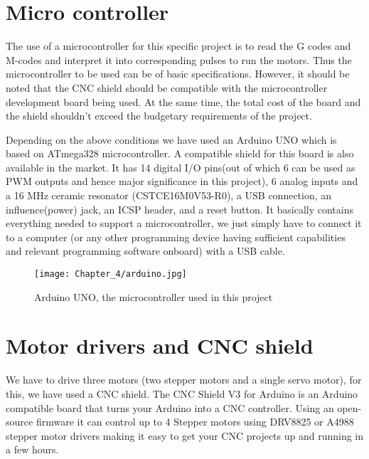 \section{Micro controller}

The use of a microcontroller for this specific project is to read the G codes and M-codes and interpret it into corresponding pulses to run the motors. Thus the microcontroller to be used can be of basic specifications. However, it should be noted that the CNC shield should be compatible with the microcontroller development board being used. At the same time, the total cost of the board and the shield shouldn’t exceed the budgetary requirements of the project. \par

Depending on the above conditions we have used an Arduino UNO which is based on ATmega328 microcontroller. A compatible shield for this board is also available in the market. It has 14 digital I/O pins(out of which 6 can be used as PWM outputs and hence major significance in this project), 6 analog inputs and a 16 MHz ceramic resonator (CSTCE16M0V53-R0), a USB connection, an influence(power) jack, an ICSP header, and a reset button. It basically contains everything needed to support a microcontroller, we just simply have to connect it to a computer (or any other programming device having sufficient capabilities and relevant programming software onboard) with a USB cable.

\begin{figure}[h]
 \centering
 \texttt{[image: Chapter\_4/arduino.jpg]}
 \caption{Arduino UNO, the microcontroller used in this project}
 \label{fig:arduino}
\end{figure}

\section{Motor drivers and CNC shield} \label{cncs}

We have to drive three motors (two stepper motors and a single servo motor), for this, we have used a CNC shield. The CNC Shield V3 for Arduino is an Arduino compatible board that turns your Arduino into a CNC controller. Using an open-source firmware it can control up to 4 Stepper motors using DRV8825 or A4988 stepper motor drivers making it easy to get your CNC projects up and running in a few hours. \pagebreak 

